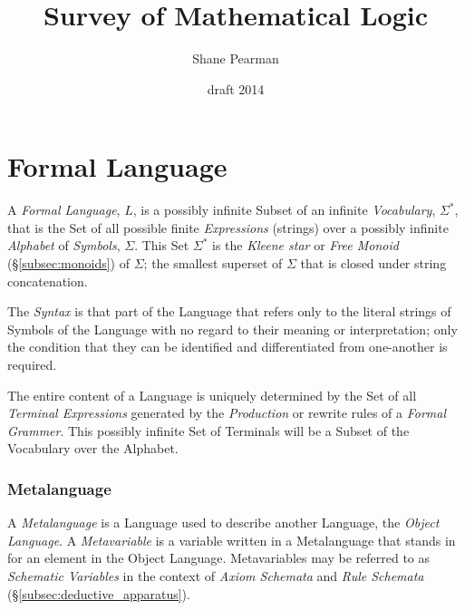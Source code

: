 \documentclass{article}
\begin{document}
\setcounter{secnumdepth}{5}
\setcounter{tocdepth}{5}


\title{Survey of Mathematical Logic}
\date{draft 2014}
\author{Shane Pearman}
\maketitle


\tableofcontents

\part{Formal Language}\label{sec:formal_language}

A \emph{Formal Language}, $L$, is a possibly infinite Subset of an
infinite \emph{Vocabulary}, $\Sigma^*$, that is the Set of all
possible finite \emph{Expressions} (strings) over a possibly infinite
\emph{Alphabet} of \emph{Symbols}, $\Sigma$. This Set $\Sigma^*$ is
the \emph{Kleene star} or \emph{Free Monoid} (\S\ref{subsec:monoids})
of $\Sigma$; the smallest superset of $\Sigma$ that is closed under
string concatenation.

The \emph{Syntax} is that part of the Language that refers only to the
literal strings of Symbols of the Language with no regard to their
meaning or interpretation; only the condition that they can be
identified and differentiated from one-another is required.

The entire content of a Language is uniquely determined by the Set of
all \emph{Terminal Expressions} generated by the \emph{Production} or
rewrite rules of a \emph{Formal Grammer}. This possibly infinite Set
of Terminals will be a Subset of the Vocabulary over the Alphabet.

\section{Metalanguage}\label{sec:metalanguage}

A \emph{Metalanguage} is a Language used to describe another Language,
the \emph{Object Language}. A \emph{Metavariable} is a variable
written in a Metalanguage that stands in for an element in the Object
Language. Metavariables may be referred to as \emph{Schematic
  Variables} in the context of \emph{Axiom Schemata} and \emph{Rule
  Schemata} (\S \ref{subsec:deductive_apparatus}).
\end{document}
